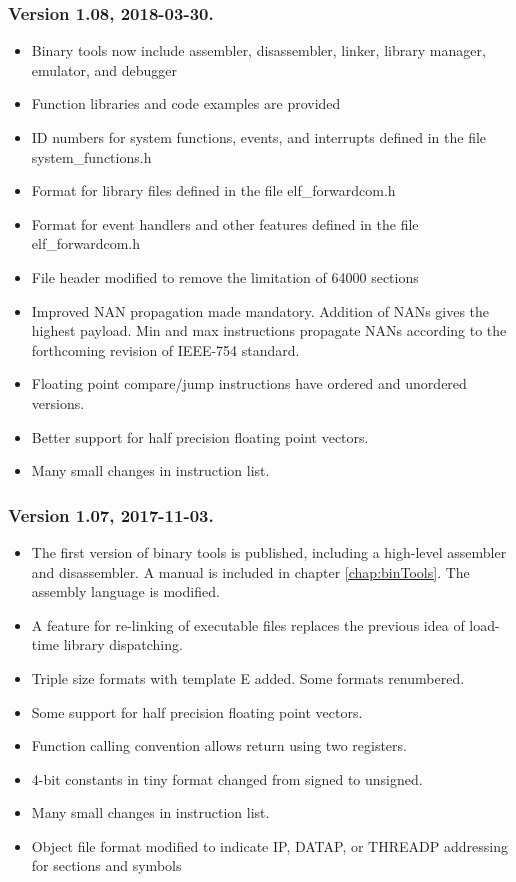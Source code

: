 \documentclass[forwardcom.tex]{subfiles}
\begin{document}
\subsubsection{Version 1.08, 2018-03-30.}
\begin{itemize}

\item Binary tools now include assembler, disassembler, linker, library manager, emulator, and debugger
\item Function libraries and code examples are provided
\item ID numbers for system functions, events, and interrupts defined in the file system\_functions.h
\item Format for library files defined in the file elf\_forwardcom.h
\item Format for event handlers and other features defined in the file elf\_forwardcom.h
\item File header modified to remove the limitation of 64000 sections
\item Improved NAN propagation made mandatory. Addition of NANs gives the highest payload. 
Min and max instructions propagate NANs according to the forthcoming revision of IEEE-754 standard.
\item Floating point compare/jump instructions have ordered and unordered versions.
\item Better support for half precision floating point vectors.
\item Many small changes in instruction list. 
\end{itemize}


\subsubsection{Version 1.07, 2017-11-03.}
\begin{itemize}
\item The first version of binary tools is published, including a high-level assembler and disassembler. A manual is included in chapter \ref{chap:binTools}. The assembly language is modified.
\item A feature for re-linking of executable files replaces the previous idea of load-time library dispatching.
\item Triple size formats with template E added. Some formats renumbered.
\item Some support for half precision floating point vectors.
\item Function calling convention allows return using two registers.
\item 4-bit constants in tiny format changed from signed to unsigned.
\item Many small changes in instruction list.
\item Object file format modified to indicate IP, DATAP, or THREADP addressing for sections and symbols
\end{itemize}
\end{document}
